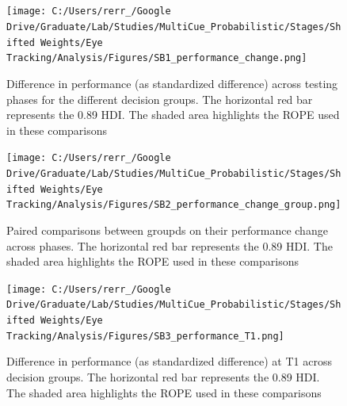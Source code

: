 \documentclass[
  english,
  man]{apa6}
\begin{document}
\clearpage
\renewcommand{\listfigurename}{Figure captions}

\clearpage
\renewcommand{\listtablename}{Table captions}


\clearpage
\makeatletter
\efloat@restorefloats
\makeatother


\begin{appendix}
\section{}
\renewcommand{\appendixname}{Supplementary Materials}
\renewcommand{\thefigure}{S\arabic{figure}} \setcounter{figure}{0}
\renewcommand{\thetable}{S\arabic{table}} \setcounter{table}{0}
\renewcommand{\theequation}{S\arabic{table}} \setcounter{equation}{0}
\graphicspath{{"../Documents/Tables and Figures/"}}

\begin{figure}
\centering
\texttt{[image: C:/Users/rerr\_/Google Drive/Graduate/Lab/Studies/MultiCue\_Probabilistic/Stages/Shifted Weights/Eye Tracking/Analysis/Figures/SB1\_performance\_change.png]}
\caption{\label{fig:performance-change}Difference in performance (as
standardized difference) across testing phases for the different
decision groups. The horizontal red bar represents the 0.89 HDI. The
shaded area highlights the ROPE used in these comparisons}
\end{figure}

\begin{figure}
\centering
\texttt{[image: C:/Users/rerr\_/Google Drive/Graduate/Lab/Studies/MultiCue\_Probabilistic/Stages/Shifted Weights/Eye Tracking/Analysis/Figures/SB2\_performance\_change\_group.png]}
\caption{\label{fig:performance-change-group}Paired comparisons between
groupds on their performance change across phases. The horizontal red
bar represents the 0.89 HDI. The shaded area highlights the ROPE used in
these comparisons}
\end{figure}

\begin{figure}
\centering
\texttt{[image: C:/Users/rerr\_/Google Drive/Graduate/Lab/Studies/MultiCue\_Probabilistic/Stages/Shifted Weights/Eye Tracking/Analysis/Figures/SB3\_performance\_T1.png]}
\caption{\label{fig:performance-T1}Difference in performance (as
standardized difference) at T1 across decision groups. The horizontal
red bar represents the 0.89 HDI. The shaded area highlights the ROPE
used in these comparisons}
\end{figure}


\end{appendix}
\end{document}
